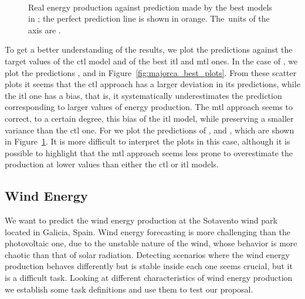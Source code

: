 \begin{figure}[t!]
    \centering%
    \quad%
    \quad%
    \\
 \caption[Real energy production against prediction made by the best models {in} .]{\label{fig:tenerife_best_plots} Real energy production against prediction made by the best models {in} ; the perfect prediction  line is shown in orange. The~units of the axis are \mwhu{}.}
\end{figure}


%
To get a better understanding of the results, we plot the predictions against the target values of the \acrshort{ctl} model and of the best \acrshort{itl} and \acrshort{mtl} ones.
%
In the case of , we plot the predictions ,  and  in Figure~\ref{fig:majorca_best_plots}.
From these scatter plots it seems that the \acrshort{ctl} approach has a larger deviation in its predictions, while the \acrshort{itl} one has a bias, that is, it systematically underestimates the prediction corresponding to larger values of energy production.
The \acrshort{mtl} approach seems to correct, to a certain degree, this bias of the \acrshort{itl} model, while preserving a smaller variance than the \acrshort{ctl} one.
%
For  we plot the predictions of ,  and , which are shown in Figure~\ref{fig:tenerife_best_plots}.
It is more difficult to interpret the plots in this case, although it is possible to highlight that the \acrshort{mtl} approach seems less prone to overestimate the production at lower values than either the \acrshort{ctl} or \acrshort{itl} models.







\subsection{Wind Energy}
We want to predict the wind energy production at the Sotavento wind park located in Galicia, Spain.
Wind energy forecasting is more challenging than the photovoltaic one, due to the unstable nature of the wind, whose behavior is more chaotic than that of solar radiation. Detecting scenarios where the wind energy production behaves differently but is stable inside each one seems crucial, but it is a difficult task. Looking at different characteristics of wind energy production we establish some task definitions and use them to test our proposal. 

